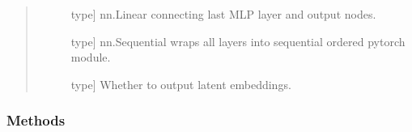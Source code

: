 \documentclass[letterpaper,10pt,english]{sphinxmanual}
\begin{document}
\begin{fulllineitems}
\begin{quote}
\begin{description}
\begin{description}
\item[{}] \leavevmode{[}type{]}
nn.Linear connecting last MLP layer and output nodes.

\item[{}] \leavevmode{[}type{]}
nn.Sequential wraps all layers into sequential ordered pytorch module.

\item[{}] \leavevmode{[}type{]}
Whether to output latent embeddings.

\item[{}] \leavevmode
\item[{}] \leavevmode
\item[{}] \leavevmode
\item[{}] \leavevmode
\end{description}

\end{description}\end{quote}
\subsubsection*{Methods}


\begin{savenotes}\sphinxatlongtablestart\begin{longtable}{}
\hline

\endfirsthead

%
{}\\
\hline

\endhead

\hline
{}\\
\endfoot

\endlastfoot


\end{longtable}
\end{savenotes}
\end{fulllineitems}
\end{document}
